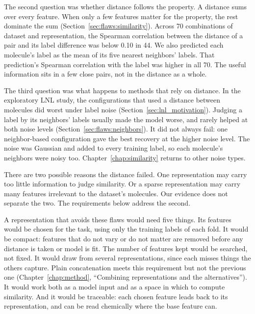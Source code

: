 The second question was whether distance follows the property. A distance sums over every feature. When only a few features matter for the property, the rest dominate the sum (Section~\ref{sec:flaws:similarity}). Across 70 combinations of dataset and representation, the Spearman correlation between the distance of a pair and its label difference was below 0.10 in 44. %
We also predicted each molecule's label as the mean of its five nearest neighbors' labels. That prediction's Spearman correlation with the label was higher in all 70. The useful information sits in a few close pairs, not in the distance as a whole.

The third question was what happens to methods that rely on distance. In the exploratory LNL study, the configurations that used a distance between molecules did worst under label noise (Section~\ref{sec:lnl_motivation}). Judging a label by its neighbors' labels usually made the model worse, and rarely helped at both noise levels (Section~\ref{sec:flaws:neighbors}). It did not always fail: one neighbor-based configuration gave the best recovery at the higher noise level. The noise was Gaussian and added to every training label, so each molecule's neighbors were noisy too. Chapter~\ref{chap:similarity} returns to other noise types.

There are two possible reasons the distance failed. One representation may carry too little information to judge similarity. Or a sparse representation may carry many features irrelevant to the dataset's molecules. Our evidence does not separate the two. The requirements below address the second.

A representation that avoids these flaws would need five things. Its features would be chosen for the task, using only the training labels of each fold. It would be compact: features that do not vary or do not matter are removed before any distance is taken or model is fit. The number of features kept would be searched, not fixed. It would draw from several representations, since each misses things the others capture. Plain concatenation meets this requirement but not the previous one (Chapter~\ref{chap:method}, ``Combining representations and the alternatives''). It would work both as a model input and as a space in which to compute similarity. And it would be traceable: each chosen feature leads back to its representation, and can be read chemically where the base feature can.

